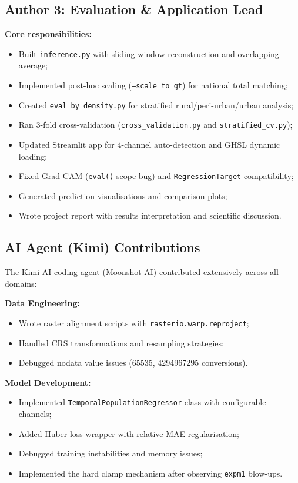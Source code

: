 \documentclass[12pt,a4paper]{article}
\begin{document}
\subsection{Author 3: Evaluation \& Application Lead}
\label{subsec:author3}

\textbf{Core responsibilities:}
\begin{itemize}
    \item Built \texttt{inference.py} with sliding-window reconstruction and overlapping average;
    \item Implemented post-hoc scaling (\texttt{--scale\_to\_gt}) for national total matching;
    \item Created \texttt{eval\_by\_density.py} for stratified rural/peri-urban/urban analysis;
    \item Ran 3-fold cross-validation (\texttt{cross\_validation.py} and \texttt{stratified\_cv.py});
    \item Updated Streamlit app for 4-channel auto-detection and GHSL dynamic loading;
    \item Fixed Grad-CAM (\texttt{eval()} scope bug) and \texttt{RegressionTarget} compatibility;
    \item Generated prediction visualisations and comparison plots;
    \item Wrote project report with results interpretation and scientific discussion.
\end{itemize}

\subsection{AI Agent (Kimi) Contributions}
\label{subsec:ai_contributions}

The Kimi AI coding agent (Moonshot AI) contributed extensively across all domains:

\textbf{Data Engineering:}
\begin{itemize}
    \item Wrote raster alignment scripts with \texttt{rasterio.warp.reproject};
    \item Handled CRS transformations and resampling strategies;
    \item Debugged nodata value issues (65535, 4294967295 conversions).
\end{itemize}

\textbf{Model Development:}
\begin{itemize}
    \item Implemented \texttt{TemporalPopulationRegressor} class with configurable channels;
    \item Added Huber loss wrapper with relative MAE regularisation;
    \item Debugged training instabilities and memory issues;
    \item Implemented the hard clamp mechanism after observing \texttt{expm1} blow-ups.
\end{itemize}
\end{document}
